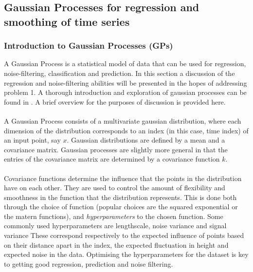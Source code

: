 \documentclass[11pt]{article}
\begin{document}
	\subsection{Gaussian Processes for regression and smoothing of time series}
	\subsubsection{Introduction to Gaussian Processes (GPs)}
	A Gaussian Process is a statistical model of data that can be used for regression, noise-filtering, classification and prediction. In this section a discussion of the regression and noise-filtering abilities will be presented in the hopes of addressing problem 1. A thorough introduction and exploration of gaussian processes can be found in \citep{rasmussen2006gpfml}. A brief overview for the purposes of discussion is provided here.
	\paragraph{}
	A Gaussian Process consists of a multivariate gaussian distribution, where each dimension of the distribution corresponds to an index (in this case, time index) of an input point, say $x$. Gaussian distributions are defined by a mean and a covariance matrix. Gaussian processes are slightly more general in that the entries of the covariance matrix are determined by a covariance function $k$. 
	\paragraph{}
	Covariance functions determine the influence that the points in the distribution have on each other. They are used to control the amount of flexibility and smoothness in the function that the distribution represents. This is done both through the choice of function (popular choices are the squared exponential or the matern functions), and \emph{hyperparameters} to the chosen function. Some commonly used hyperparameters are lengthscale, noise variance and signal variance These correspond respectively to the expected influence of points based on their distance apart in the index, the expected fluctuation in height and expected noise in the data. Optimising the hyperparameters for the dataset is key to getting good regression, prediction and noise filtering.
	
\end{document}
